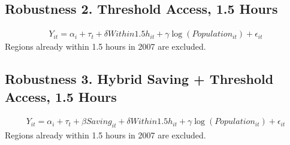 \documentclass[a4paper, 10pt]{article}
\begin{document}
\begin{table}[H]
\centering
\caption{Robustness 1. Continuous Saving, Excluding Already-Treated Regions: 의사}

\end{table}

\subsection{Robustness 2. Threshold Access, 1.5 Hours}
\begin{align*}
    Y_{it}=\alpha_i+\tau_t+\delta Within1.5h_{it}+\gamma\log(Population_{it})+\epsilon_{it}
\end{align*}
Regions already within 1.5 hours in 2007 are excluded.
\begin{table}[H]
\centering
\caption{Robustness 2. Threshold Access, 1.5 Hours: 의원}

\end{table}

\begin{table}[H]
\centering
\caption{Robustness 2. Threshold Access, 1.5 Hours: 병원}

\end{table}

\begin{table}[H]
\centering
\caption{Robustness 2. Threshold Access, 1.5 Hours: 종합병원}

\end{table}

\begin{table}[H]
\centering
\caption{Robustness 2. Threshold Access, 1.5 Hours: 상급종합병원}

\end{table}

\begin{table}[H]
\centering
\caption{Robustness 2. Threshold Access, 1.5 Hours: 의사}

\end{table}

\subsection{Robustness 3. Hybrid Saving + Threshold Access, 1.5 Hours}
\begin{align*}
    Y_{it}=\alpha_i+\tau_t+\beta Saving_{it}+\delta Within1.5h_{it}+\gamma\log(Population_{it})+\epsilon_{it}
\end{align*}
Regions already within 1.5 hours in 2007 are excluded.
\begin{table}[H]
\centering
\caption{Robustness 3. Hybrid Saving + Threshold Access, 1.5 Hours: 의원}

\end{table}
\end{document}
